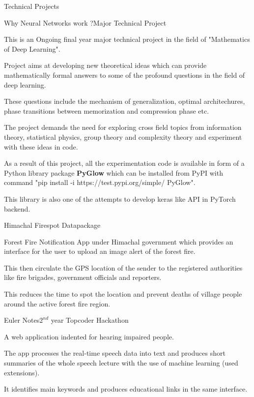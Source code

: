 \documentclass{resume} %
\begin{document}
\begin{rSection}{Technical Projects}

\begin{rSubsection}{Why Neural Networks work ?}{Major Technical Project}{}{}
\item This is an Ongoing final year major technical project in the field of "Mathematics of Deep Learning".
\item Project aims at developing new theoretical ideas which can provide mathematically formal answers to some of the profound questions in the field of deep learning.
\item These questions include the mechanism of generalization, optimal architechures, phase transitions between memorization and compression phase etc.
\item The project demands the need for exploring cross field topics from information theory, statistical physics, group theory and complexity theory and experiment with these ideas in code.
\item As a result of this project, all the experimentation code is available in form of a Python library package \textbf{PyGlow} which can be installed from PyPI with command "pip install -i https://test.pypi.org/simple/ PyGlow".
\item This library is also one of the attempts to develop keras like API in PyTorch backend.
\end{rSubsection}
\newpage
\begin{rSubsection}{Himachal Firespot Datapackage}{}{}{}
\item Forest Fire Notification App under Himachal government which provides an interface for the user to
upload an image alert of the forest fire. 
\item This then circulate the GPS location of the sender  to the registered authorities like fire brigades, government officials and reporters. 
\item This reduces the time to spot the location and prevent deaths of village people around the active forest fire region. 
\end{rSubsection}

\begin{rSubsection}{Euler Notes}{$2^{nd}$ year Topcoder Hackathon}{}{}
\item A web application indented for hearing impaired people. 
\item The app processes the real-time speech data into text and produces short summaries of the whole speech lecture with the use of machine learning (used extensions). 
\item It identifies main keywords and produces educational links in the same interface.
\end{rSubsection}

\end{rSection}
\end{document}
